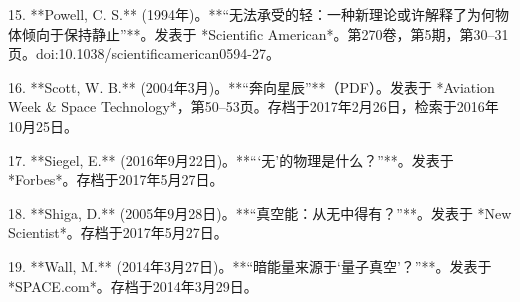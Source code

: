 \begin{itemize}
15. **Powell, C. S.** (1994年)。**“无法承受的轻：一种新理论或许解释了为何物体倾向于保持静止”**。发表于 *Scientific American*。第270卷，第5期，第30–31页。doi:10.1038/scientificamerican0594-27。

16. **Scott, W. B.** (2004年3月)。**“奔向星辰”**（PDF）。发表于 *Aviation Week & Space Technology*，第50–53页。存档于2017年2月26日，检索于2016年10月25日。

17. **Siegel, E.** (2016年9月22日)。**“‘无’的物理是什么？”**。发表于 *Forbes*。存档于2017年5月27日。

18. **Shiga, D.** (2005年9月28日)。**“真空能：从无中得有？”**。发表于 *New Scientist*。存档于2017年5月27日。

19. **Wall, M.** (2014年3月27日)。**“暗能量来源于‘量子真空’？”**。发表于 *SPACE.com*。存档于2014年3月29日。
\end{itemize}